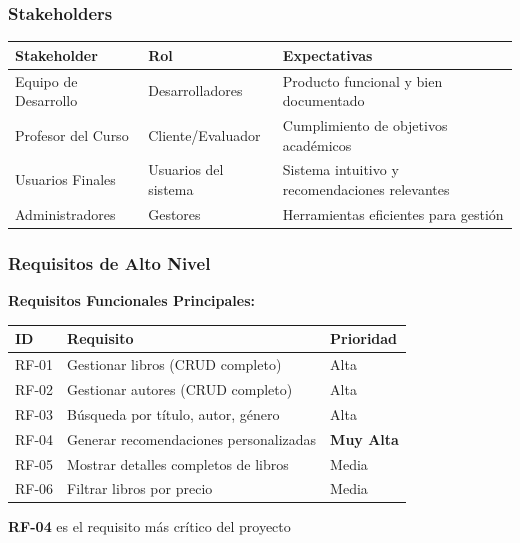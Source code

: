 \documentclass[aspectratio=169]{beamer}
\begin{document}
\begin{frame}
\frametitle{Stakeholders}

\begin{table}
\centering
\small
\begin{tabular}{p{3cm}p{3cm}p{5cm}}
\toprule
\textbf{Stakeholder} & \textbf{Rol} & \textbf{Expectativas} \\
\midrule
Equipo de Desarrollo & Desarrolladores & Producto funcional y bien documentado \\
Profesor del Curso & Cliente/Evaluador & Cumplimiento de objetivos académicos \\
Usuarios Finales & Usuarios del sistema & Sistema intuitivo y recomendaciones relevantes \\
Administradores & Gestores & Herramientas eficientes para gestión \\
\bottomrule
\end{tabular}
\end{table}

\end{frame}

\begin{frame}
\frametitle{Requisitos de Alto Nivel}

\textbf{Requisitos Funcionales Principales:}

\begin{table}
\centering
\small
\begin{tabular}{p{1.5cm}p{7cm}p{2cm}}
\toprule
\textbf{ID} & \textbf{Requisito} & \textbf{Prioridad} \\
\midrule
RF-01 & Gestionar libros (CRUD completo) & Alta \\
RF-02 & Gestionar autores (CRUD completo) & Alta \\
RF-03 & Búsqueda por título, autor, género & Alta \\
RF-04 & Generar recomendaciones personalizadas & \textbf{Muy Alta} \\
RF-05 & Mostrar detalles completos de libros & Media \\
RF-06 & Filtrar libros por precio & Media \\
\bottomrule
\end{tabular}
\end{table}

\vspace{0.3cm}

\begin{tcolorbox}[colback=yellow!5, colframe=yellow!50]
\textbf{RF-04} es el requisito más crítico del proyecto
\end{tcolorbox}

\end{frame}
\end{document}
